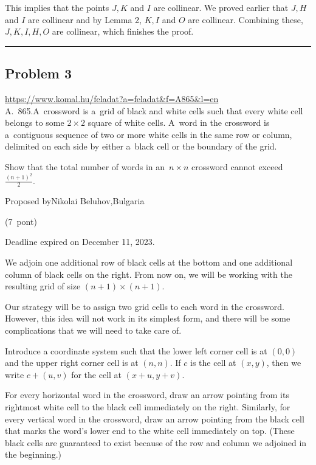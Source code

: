 \documentclass{article}
\begin{document}
This implies that the points \(\displaystyle J, K\) and \(\displaystyle I\) are collinear. We proved earlier that \(\displaystyle J, H\) and \(\displaystyle I\) are collinear and by Lemma 2, \(\displaystyle K, I\) and \(\displaystyle O\) are collinear.  Combining these, \(\displaystyle J, K, I, H, O\) are collinear, which finishes the proof.

\vspace{1em}
\hrule
\vspace{1em}

\subsection*{Problem 3}
\noindent\url{https://www.komal.hu/feladat?a=feladat&f=A865&l=en}\\[1em]

A. 865.A crossword is a grid of black and white cells such that every white cell belongs to some \(\displaystyle 2 \times 2\) square of white cells. A word in the crossword is a contiguous sequence of two or more white cells in the same row or column, delimited on each side by either a black cell or the boundary of the grid.

Show that the total number of words in an \(\displaystyle n\times n\) crossword cannot exceed \(\displaystyle \frac{{(n+1)}^2}{2}\).

Proposed byNikolai Beluhov,Bulgaria

(7 pont)

Deadline expired on December 11, 2023.

We adjoin one additional row of black cells at the bottom and one additional column of black cells on the right. From now on, we will be working with the resulting grid of size \(\displaystyle (n + 1) \times (n + 1)\).

Our strategy will be to assign two grid cells to each word in the crossword. However, this idea will not work in its simplest form, and there will be some complications that we will need to take care of.

Introduce a coordinate system such that the lower left corner cell is at \(\displaystyle (0, 0)\) and the upper right corner cell is at \(\displaystyle (n, n)\). If \(\displaystyle c\) is the cell at \(\displaystyle (x, y)\), then we write \(\displaystyle c + (u, v)\) for the cell at \(\displaystyle (x + u, y + v)\).

For every horizontal word in the crossword, draw an arrow pointing from its rightmost white cell to the black cell immediately on the right. Similarly, for every vertical word in the crossword, draw an arrow pointing from the black cell that marks the word's lower end to the white cell immediately on top. (These black cells are guaranteed to exist because of the row and column we adjoined in the beginning.)
\end{document}
